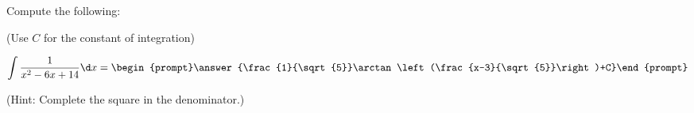 \documentclass{ximera}
\author{Jim Talamo}
\begin{document}
\begin{exercise}
Compute the following:

\begin{prompt} (Use $C$ for the constant of integration) \end{prompt}

\[
\int \frac{1}{x^2-6x+14} \d x =
\begin{prompt}\answer{\frac{1}{\sqrt{5}}\arctan\left(\frac{x-3}{\sqrt{5}}\right)+C}\end{prompt} \\
\]

\begin{prompt} (Hint: Complete the square in the denominator.) \end{prompt}
\end{exercise}
\end{document}

